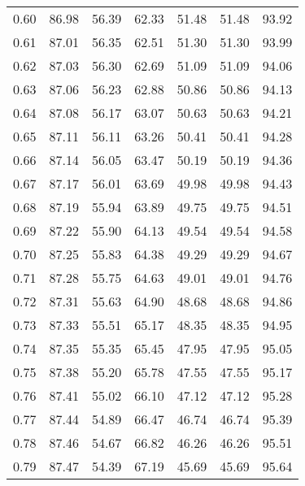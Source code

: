 \begin{tabular}{|c|c|c|c|c|c|c|}
      0.60 &     86.98 &     56.39 &      62.33 &   51.48 &      51.48 &         93.92 \\
      0.61 &     87.01 &     56.35 &      62.51 &   51.30 &      51.30 &         93.99 \\
      0.62 &     87.03 &     56.30 &      62.69 &   51.09 &      51.09 &         94.06 \\
      0.63 &     87.06 &     56.23 &      62.88 &   50.86 &      50.86 &         94.13 \\
      0.64 &     87.08 &     56.17 &      63.07 &   50.63 &      50.63 &         94.21 \\
      0.65 &     87.11 &     56.11 &      63.26 &   50.41 &      50.41 &         94.28 \\
      0.66 &     87.14 &     56.05 &      63.47 &   50.19 &      50.19 &         94.36 \\
      0.67 &     87.17 &     56.01 &      63.69 &   49.98 &      49.98 &         94.43 \\
      0.68 &     87.19 &     55.94 &      63.89 &   49.75 &      49.75 &         94.51 \\
      0.69 &     87.22 &     55.90 &      64.13 &   49.54 &      49.54 &         94.58 \\
      0.70 &     87.25 &     55.83 &      64.38 &   49.29 &      49.29 &         94.67 \\
      0.71 &     87.28 &     55.75 &      64.63 &   49.01 &      49.01 &         94.76 \\
      0.72 &     87.31 &     55.63 &      64.90 &   48.68 &      48.68 &         94.86 \\
      0.73 &     87.33 &     55.51 &      65.17 &   48.35 &      48.35 &         94.95 \\
      0.74 &     87.35 &     55.35 &      65.45 &   47.95 &      47.95 &         95.05 \\
      0.75 &     87.38 &     55.20 &      65.78 &   47.55 &      47.55 &         95.17 \\
      0.76 &     87.41 &     55.02 &      66.10 &   47.12 &      47.12 &         95.28 \\
      0.77 &     87.44 &     54.89 &      66.47 &   46.74 &      46.74 &         95.39 \\
      0.78 &     87.46 &     54.67 &      66.82 &   46.26 &      46.26 &         95.51 \\
      0.79 &     87.47 &     54.39 &      67.19 &   45.69 &      45.69 &         95.64 \\

\end{tabular}
